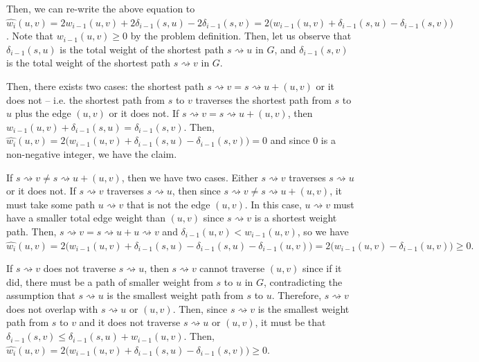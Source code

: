 \documentclass[11pt]{article}
\begin{document}
Then, we can re-write the above equation to $\hat{w_i}(u,v) = 2w_{i-1}(u,v) + 2\delta_{i-1}(s,u) - 2\delta_{i-1}(s,v) = 2\Big( w_{i-1}(u,v) + \delta_{i-1}(s,u) - \delta_{i-1}(s,v) \Big)$. Note that $w_{i-1}(u,v) \geq 0$ by the problem definition. Then, let us observe that $\delta_{i-1}(s,u)$ is the total weight of the shortest path $s \rightsquigarrow u$ in $G$, and $\delta_{i-1}(s,v)$ is the total weight of the shortest path $s \rightsquigarrow v$ in $G$.

Then, there exists two cases: the shortest path $s \rightsquigarrow v = s \rightsquigarrow u + (u,v)$ or it does not -- i.e. the shortest path from $s$ to $v$ traverses the shortest path from $s$ to $u$ plus the edge $(u,v)$ or it does not. If $s \rightsquigarrow v = s \rightsquigarrow u + (u,v)$, then $w_{i-1}(u,v) + \delta_{i-1}(s,u) = \delta_{i-1}(s,v)$. Then, $\hat{w_i}(u,v) = 2\Big( w_{i-1}(u,v) + \delta_{i-1}(s,u) - \delta_{i-1}(s,v) \Big) = 0$ and since 0 is a non-negative integer, we have the claim.

If $s \rightsquigarrow v \neq s \rightsquigarrow u + (u,v)$, then we have two cases. Either $s \rightsquigarrow v$ traverses $s \rightsquigarrow u$ or it does not. If $s \rightsquigarrow v$ traverses $s \rightsquigarrow u$, then since $s \rightsquigarrow v \neq s \rightsquigarrow u + (u,v)$, it must take some path $u \rightsquigarrow v$ that is not the edge $(u,v)$. In this case, $u \rightsquigarrow v$ must have a smaller total edge weight than $(u,v)$ since $s \rightsquigarrow v$ is a shortest weight path. Then, $s \rightsquigarrow v = s \rightsquigarrow u + u \rightsquigarrow v$ and $\delta_{i-1}(u,v) < w_{i-1}(u,v)$, so we have $\hat{w_i}(u,v) = 2\Big( w_{i-1}(u,v) + \delta_{i-1}(s,u) - \delta_{i-1}(s,u) - \delta_{i-1}(u,v) \Big) = 2\Big( w_{i-1}(u,v) - \delta_{i-1}(u,v) \Big) \geq 0.$

If $s \rightsquigarrow v$ does not traverse $s \rightsquigarrow u$, then $s \rightsquigarrow v$ cannot traverse $(u,v)$ since if it did, there must be a path of smaller weight from $s$ to $u$ in $G$, contradicting the assumption that $s \rightsquigarrow u$ is the smallest weight path from $s$ to $u$. Therefore, $s \rightsquigarrow v$ does not overlap with $s \rightsquigarrow u$ or $(u,v)$. Then, since $s \rightsquigarrow v$ is the smallest weight path from $s$ to $v$ and it does not traverse $s \rightsquigarrow u$ or $(u,v)$, it must be that $\delta_{i-1}(s,v) \leq \delta_{i-1}(s,u) + w_{i-1}(u,v)$. Then, $\hat{w_i}(u,v) = 2\Big( w_{i-1}(u,v) + \delta_{i-1}(s,u) - \delta_{i-1}(s,v) \Big) \geq 0$.
\end{document}
